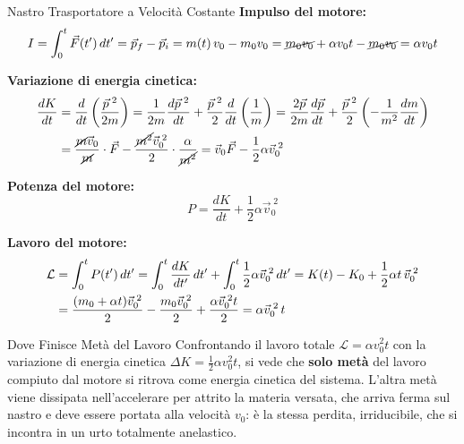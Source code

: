 \begin{formulario}{Nastro Trasportatore a Velocità Costante}
\textbf{Impulso del motore:}
\begin{equation}
    I = \int_0^t \vec{F}(t')\,dt' = \vec{p}_f - \vec{p}_i = m(t)\,v_0 - m_0 v_0
      = \cancel{m_0v_0} + \alpha v_0 t - \cancel{m_0v_0} = \alpha v_0 t
\end{equation}

\textbf{Variazione di energia cinetica:}
\begin{align}
    \frac{dK}{dt} &= \frac{d}{dt}\left(\frac{\vec{p}^{\;2}}{2m}\right)
      = \frac{1}{2m}\frac{d\vec{p}^{\;2}}{dt} + \frac{\vec{p}^{\;2}}{2}\frac{d}{dt}\left(\frac{1}{m}\right)
      = \frac{2\vec{p}}{2m}\frac{d\vec{p}}{dt} + \frac{\vec{p}^{\;2}}{2}\left(-\frac{1}{m^2}\frac{dm}{dt}\right) \notag \\
      &= \frac{\cancel{m}\vec{v}_0}{\cancel{m}}\cdot\vec{F} - \frac{\cancel{m^2}\vec{v}_0^{\;2}}{2}\cdot\frac{\alpha}{\cancel{m^2}}
      = \vec{v}_0 \vec{F} - \frac{1}{2}\alpha \vec{v}_0^{\;2}
\end{align}

\textbf{Potenza del motore:}
\begin{equation}
    P = \frac{dK}{dt} + \frac{1}{2}\alpha \vec{v}_0^{\;2}
\end{equation}

\textbf{Lavoro del motore:}
\begin{align}
    \mathcal{L} &= \int_0^t P(t')\,dt'
      = \int_0^t \frac{dK}{dt'}\,dt' + \int_0^t \frac{1}{2}\alpha \vec{v}_0^{\;2}\,dt'
      = K(t) - K_0 + \frac{1}{2}\alpha t \,\vec{v}_0^{\;2} \notag \\
      &= \frac{(m_0 + \alpha t)\vec{v}_0^{\;2}}{2} - \frac{m_0\vec{v}_0^{\;2}}{2} + \frac{\alpha \vec{v}_0^{\;2} t}{2}
      = \alpha \vec{v}_0^{\;2}\, t
\end{align}
\end{formulario}

\begin{osservazione}{Dove Finisce Metà del Lavoro}
Confrontando il lavoro totale $\mathcal{L} = \alpha v_0^2 t$ con la variazione di energia cinetica $\Delta K = \frac{1}{2}\alpha v_0^2 t$, si vede che \textbf{solo metà} del lavoro compiuto dal motore si ritrova come energia cinetica del sistema. L'altra metà viene dissipata nell'accelerare per attrito la materia versata, che arriva ferma sul nastro e deve essere portata alla velocità $v_0$: è la stessa perdita, irriducibile, che si incontra in un urto totalmente anelastico.
\end{osservazione}

